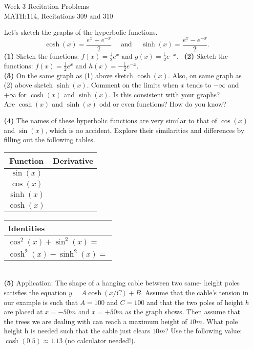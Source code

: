 \documentclass[11pt]{article}
\begin{document}
	\thispagestyle{empty}
	{
		\centering
		\huge{Week 3 Recitation Problems} \\
		\Large{MATH:114, Recitations 309 and 310} \\
	}
	\vspace{3em}
	
	
Let's sketch the graphs of the hyperbolic functions.
\[\cosh (x)=\frac{e^{x}+e^{-x}}{2} \quad \text { and } \quad \sinh (x)=\frac{e^{x}-e^{-x}}{2}.\]
\textbf{(1)} Sketch the functions: $f(x)=\frac{1}{2} e^{x} \text { and } g(x)=\frac{1}{2} e^{-x}$. \ \textbf{(2)} Sketch the functions: $f(x)=\frac{1}{2} e^{x} \text { and } h(x)=-\frac{1}{2} e^{-x}$.
\vspace{6 cm}\\
\textbf{(3)} On the same graph as (1) above sketch $\cosh(x)$. Also, on same graph as (2) above sketch $\sinh(x)$. Comment on the limits when $x$ tends to $-\infty$ and $+\infty$ for $\cosh(x)$ and $\sinh(x)$. Is this consistent with your graphs?
\vspace{3 cm}\\ 
Are $\cosh(x)$ and $\sinh(x)$ odd or even functions? How do you know?

\newpage
\textbf{(4)} The names of these hyperbolic functions are very similar to that of $\cos(x)$ and $\sin(x)$, which is no accident.
Explore their similarities and differences by filling out the following tables.
\vspace{0.5  cm}\\
\begin{tabular}{|c|p{4 cm} |}
	\hline
	\textbf{Function} & \textbf{Derivative} \\
	\hline
	$\sin(x)$ & \\
	\hline
	$\cos(x) $ & \\
	\hline
	$\sinh(x)$ & \\
	\hline
	$\cosh(x) $ & \\
	\hline
\end{tabular}
\hspace{2 cm}
	\begin{tabular}{|p{6 cm}|}
		\hline
	\textbf{Identities}\\
	\hline
	$\cos^2(x)+\sin^2(x)=$\\
	\hline
	$\cosh^2(x)-\sinh^2(x)=$\\
	\hline
\end{tabular}
\vspace{3 cm}\\
\textbf{(5)} Application: The shape of a hanging cable between two same-
height poles satisfies the equation $y = A \cosh(x/C) + B$. Assume
that the cable's tension in our example is such that $A = 100$ and
$C = 100$ and that the two poles of height $h$ are placed at $x = -50m$
and $x = +50m$ as the graph shows. Then assume that the trees we
are dealing with can reach a maximum height of $10m$.
What pole height h is needed such that the cable just clears $10m$?
Use the following value: $\cosh(0.5) \approx1.13$ (no calculator needed!).
	
\end{document}
